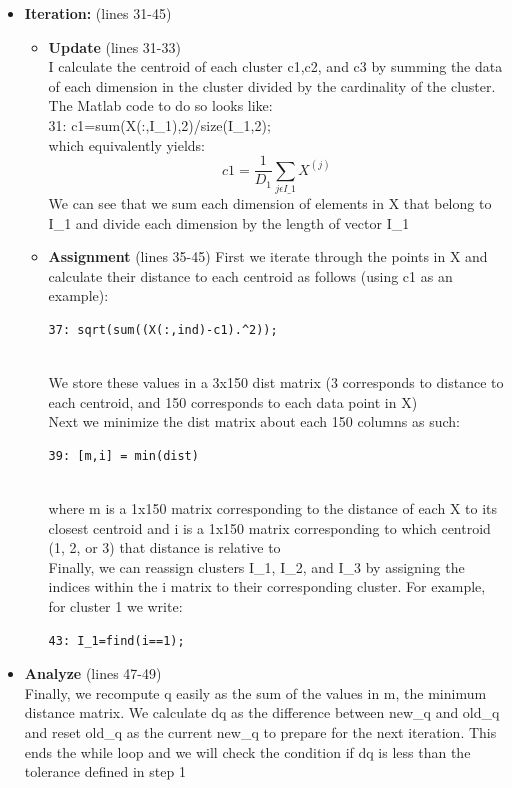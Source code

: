 \documentclass{article}
\begin{document}
\begin{itemize}
    \item \textbf{Iteration:} (lines 31-45)\\
    \begin{itemize}
        \item \textbf{Update} (lines 31-33)\\
        I calculate the centroid of each cluster c1,c2, and c3 by summing the data of each dimension in the cluster divided by the cardinality of the cluster.  The Matlab code to do so looks like:\\
        31: c1=sum(X(:,I\_1),2)/size(I\_1,2); \\
        which equivalently yields:\\
        \[c1=\frac{1}{D_1} \sum_{j\epsilon I\_1} X^{(j)}\]
        We can see that we sum each dimension of elements in X that belong to I\_1 and divide each dimension by the length of vector I\_1
        \item \textbf{Assignment} (lines 35-45)
        First we iterate through the points in X and calculate their distance to each centroid as follows (using c1 as an example):\\
        \begin{verbatim}37: sqrt(sum((X(:,ind)-c1).^2));\end{verbatim}\\
        We store these values in a 3x150 dist matrix (3 corresponds to distance to each centroid, and 150 corresponds to each data point in X)\\
        Next we minimize the dist matrix about each 150 columns as such:\\
        \begin{verbatim}39: [m,i] = min(dist)\end{verbatim}\\
        where m is a 1x150 matrix corresponding to the distance of each X to its closest centroid and i is a 1x150 matrix corresponding to which centroid (1, 2, or 3) that distance is relative to\\
        Finally, we can reassign clusters I\_1, I\_2, and I\_3 by assigning the indices within the i matrix to their corresponding cluster.  For example, for cluster 1 we write:\\
        \begin{verbatim}43: I_1=find(i==1);\end{verbatim}
    \end{itemize}
    
    \item \textbf{Analyze} (lines 47-49)\\
    Finally, we recompute q easily as the sum of the values in m, the minimum distance matrix.  We calculate dq as the difference between  new\_q and old\_q and reset old\_q as the current new\_q to prepare for the next iteration.  This ends the while loop and we will check the condition if dq is less than the tolerance defined in step 1
    
\end{itemize}
\end{document}
